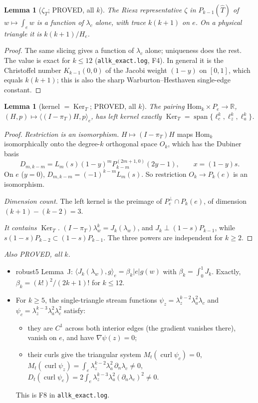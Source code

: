 \documentclass[11pt]{article}
\newtheorem{lemma}[theorem]{Lemma}
\theoremstyle{remark}
\newcommand{\ip}[2]{\langle #1,#2\rangle}
\begin{document}
\begin{lemma}[$\zeta_T$; PROVED, all $k$]\label{lem:zeta}
The Riesz representative $\zeta$ in $P_{k-1}(\hat T)$ of $w\mapsto\int_ew$ is a function of $\lambda_c$ alone, with trace $k(k+1)$ on $e$.
On a physical triangle it is $k(k+1)/H_e$.
\end{lemma}
\begin{proof}
The same slicing gives a function of $\lambda_c$ alone; uniqueness does the rest. The value is exact for $k\le12$ (\texttt{allk\_exact.log}, F4).
In general it is the Christoffel number $K_{k-1}(0,0)$ of the Jacobi weight $(1-y)$ on $[0,1]$, which equals $k(k+1)$; this is also the sharp
Warburton--Hesthaven single-edge constant.
\end{proof}

\begin{lemma}[kernel $=\operatorname{Ker}_T$; PROVED, all $k$]\label{lem:ker}
The pairing $\mathrm{Hom}_k\times P_e\to\mathbb R$, $(H,p)\mapsto\ip{(I-\pi_T)H}p_e$, has left kernel exactly
$\operatorname{Ker}_T=\operatorname{span}\{\ell_c^k,\ell_z^k,\ell_a^k\}$.
\end{lemma}
\begin{proof}
\emph{Restriction is an isomorphism.} $H\mapsto(I-\pi_T)H$ maps $\mathrm{Hom}_k$ isomorphically onto the degree-$k$ orthogonal space $O_k$, which has the Dubiner basis
\[
D_{m,k-m}=L_m(s)(1-y)^mP^{(2m+1,0)}_{k-m}(2y-1),\qquad x=(1-y)s .
\]
On $e$ ($y=0$), $D_{m,k-m}=(-1)^{k-m}L_m(s)$. So restriction $O_k\to P_k(e)$ is an isomorphism.

\emph{Dimension count.} The left kernel is the preimage of $P_e^\perp\cap P_k(e)$, of dimension $(k+1)-(k-2)=3$.

\emph{It contains $\operatorname{Ker}_T$.} $(I-\pi_T)\lambda_w^k=J_k(\lambda_w)$, and $J_k\perp(1-s)P_{k-1}$, while $s(1-s)P_{k-2}\subset(1-s)P_{k-1}$.
The three powers are independent for $k\ge2$.
\end{proof}

\noindent\emph{Also PROVED, all $k$.}
\begin{itemize}
\item robust5 Lemma~J: $\ip{J_k(\lambda_w)}g_e=\beta_k|e|g(w)$ with $\beta_k=\int_0^1J_k$. Exactly, $\beta_k=(k!)^2/(2k+1)!$ for $k\le12$.
\item For $k\ge5$, the single-triangle stream functions $\psi_z=\lambda_z^{k-2}\lambda_a^2\lambda_c$ and $\psi_c=\lambda_z^{k-3}\lambda_a^2\lambda_c^2$ satisfy:
 \begin{itemize}
 \item they are $C^1$ across both interior edges (the gradient vanishes there), vanish on $e$, and have $\nabla\psi(z)=0$;
 \item their curls give the triangular system $M_t(\operatorname{curl}\psi_c)=0$, $M_t(\operatorname{curl}\psi_z)=\int_e\lambda_z^{k-2}\lambda_a^2\,\partial_n\lambda_c\ne0$, $D_t(\operatorname{curl}\psi_c)=2\int_e\lambda_z^{k-3}\lambda_a^2(\partial_n\lambda_c)^2\ne0$.
 \end{itemize}
 This is F8 in \texttt{allk\_exact.log}.
\end{itemize}
\end{document}
